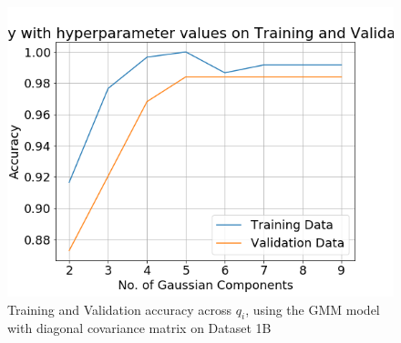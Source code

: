 \documentclass[11pt,a4paper]{article}
\begin{document}
\vspace{-2em}
\begin{figure}[H]
    \centering
    \includegraphics[scale=0.5]{images/acc_1b.png}
    \caption{Training and Validation accuracy across $q_i$, using the GMM model with diagonal covariance matrix on Dataset 1B}
    \label{fig:acc1bGMMdiag}
\end{figure}
\end{document}

